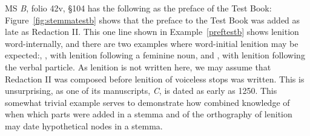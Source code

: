 MS \textit{B}, folio 42v, \S 104 has the following as the preface of the Test Book:
Figure~\ref{fig:stemmatestb} shows that the preface to the Test Book was added as late as Redaction II.
This one line shown in Example~\ref{preftestb} shows lenition word-internally, and there are two examples  where word-initial lenition may be expected:, , with lenition following a feminine noun, and , with lenition following the verbal particle.
As lenition  is not written here, we may assume that Redaction II was composed before lenition of voiceless stops was written.
This is unsurprising, as one of its manuscripts, \textit{C}, is dated as early as 1250.
This somewhat trivial example serves to demonstrate how combined knowledge of when which parts were added in a stemma and of the orthography of lenition may date hypothetical nodes in a stemma. 

